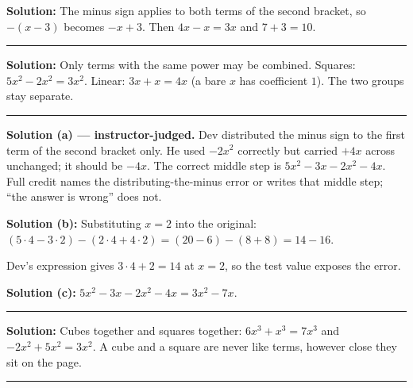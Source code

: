 \documentclass[12pt]{article}
\begin{document}



\textbf{Solution:} \quad The minus sign applies to both terms of the second bracket, so
$-(x - 3)$ becomes $-x + 3$. Then $4x - x = 3x$ and $7 + 3 = 10$. 

\vspace{0.15cm}\noindent\rule{\linewidth}{0.2pt}


\textbf{Solution:} \quad Only terms with the same power may be combined.
Squares: $5x^2 - 2x^2 = 3x^2$. Linear: $3x + x = 4x$ (a bare $x$ has coefficient $1$).
The two groups stay separate. 

\vspace{0.15cm}\noindent\rule{\linewidth}{0.2pt}


\textbf{Solution (a) --- instructor-judged.} Dev distributed the minus sign to the first term of the
second bracket only. He used $-2x^2$ correctly but carried $+4x$ across unchanged; it should be
$-4x$. The correct middle step is $5x^2 - 3x - 2x^2 - 4x$. Full credit names the
distributing-the-minus error or writes that middle step; ``the answer is wrong'' does not.

\noindent\textbf{Solution (b):} \quad Substituting $x = 2$ into the original:
$(5\cdot 4 - 3\cdot 2) - (2\cdot 4 + 4\cdot 2) = (20 - 6) - (8 + 8) = 14 - 16$. 

\noindent Dev's expression gives $3\cdot 4 + 2 = 14$ at $x = 2$, so the test value exposes the error.

\noindent\textbf{Solution (c):} \quad $5x^2 - 3x - 2x^2 - 4x = 3x^2 - 7x$. 

\vspace{0.15cm}\noindent\rule{\linewidth}{0.2pt}


\textbf{Solution:} \quad Cubes together and squares together:
$6x^3 + x^3 = 7x^3$ and $-2x^2 + 5x^2 = 3x^2$. A cube and a square are never like terms, however
close they sit on the page. 

\vspace{0.15cm}\noindent\rule{\linewidth}{0.2pt}
\end{document}
